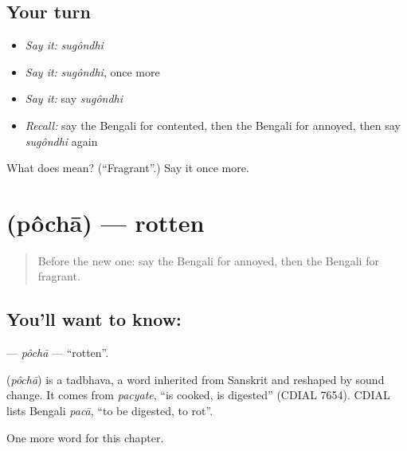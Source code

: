 \subsection*{Your turn}
\begin{itemize}
\raggedright
  \item \emph{Say it:} \emph{sugôndhi}
  \item \emph{Say it:} \emph{sugôndhi}, once more
  \item \emph{Say it:} say \emph{sugôndhi}
  \item \emph{Recall:} say the Bengali for contented, then the Bengali for annoyed, then say \emph{sugôndhi} again
\end{itemize}

\begin{tcolorbox}[breakable,colback=teal!4,colframe=teal!35!black,title={Before you move on}]
What does  mean? (\textquotedblleft{}Fragrant\textquotedblright{}.) Say it once more.
\end{tcolorbox}
\section[\texorpdfstring{\bn{পচা} (pôchā)}{পচা (pôchā)}]{ (pôchā) — rotten}

\label{lesson:BN-C162-pocha}



\begin{quote}
Before the new one: say the Bengali for annoyed, then the Bengali for fragrant.
\end{quote}

\subsection*{You'll want to know: }
\textbf{} — \emph{pôchā} — \textquotedblleft{}rotten\textquotedblright{}.

\begin{cousinweb}
\textbf{} (\emph{pôchā}) is a tadbhava, a word inherited from Sanskrit and reshaped by sound change. It comes from \emph{pacyate}, \textquotedblleft{}is cooked, is digested\textquotedblright{} (CDIAL 7654). CDIAL lists Bengali \emph{pacā}, \textquotedblleft{}to be digested, to rot\textquotedblright{}.
\end{cousinweb}

\begin{grammarlens}[title={What you've built}]
One more word for this chapter.
\end{grammarlens}

